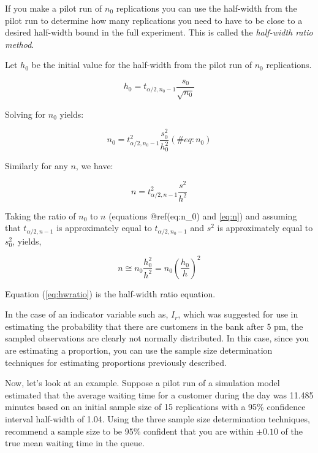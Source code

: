 \documentclass[
]{book}
\theoremstyle{definition}
\theoremstyle{definition}
\theoremstyle{definition}
\theoremstyle{definition}
\theoremstyle{remark}
\begin{document}
If you make a pilot run of \(n_0\) replications you can use the half-width from the pilot run
to determine how many replications you need to have to be close to a
desired half-width bound in the full experiment. This is called the
\emph{half-width ratio method}.

Let \(h_0\) be the initial value for the half-width from the pilot run of
\(n_0\) replications.

\begin{equation}
h_0 = t_{\alpha/2, n_0 - 1} \dfrac{s_0}{\sqrt{n_0}}
\label{eq:hNot}
\end{equation}

Solving for \(n_0\) yields:

\begin{equation}
n_0 = t_{\alpha/2, n_0 -1}^{2} \dfrac{s_{0}^{2}}{h_{0}^{2}}
(\#eq:n_0)
\end{equation}

Similarly for any \(n\), we have:

\begin{equation}
n = t_{\alpha/2, n-1}^{2} \dfrac{s^{2}}{h^{2}}
\label{eq:n}
\end{equation}

Taking the ratio of \(n_0\) to \(n\) (equations @ref(eq:n\_0) and \eqref{eq:n}) and assuming
that \(t_{\alpha/2, n-1}\) is approximately equal to
\(t_{\alpha/2, n_0 - 1}\) and \(s^2\) is approximately equal to \(s_0^2\),
yields,

\begin{equation}
n \cong n_0 \dfrac{h_0^2}{h^2} = n_0 \left(\frac{h_0}{h}\right)^2
\label{eq:hwratio}
\end{equation}

Equation (\eqref{eq:hwratio}) is the half-width ratio equation.

In the case of an indicator variable such as, \(I_r\), which was suggested
for use in estimating the probability that there are customers in the
bank after 5 pm, the sampled observations are clearly not normally
distributed. In this case, since you are estimating a proportion, you
can use the sample size determination techniques for estimating
proportions previously described.

Now, let's look at an example. Suppose a pilot run of a
simulation model estimated that the average waiting time for a customer
during the day was 11.485 minutes based on an initial sample size of 15
replications with a 95\% confidence interval half-width of 1.04. Using
the three sample size determination techniques, recommend a sample size
to be 95\% confident that you are within \(\pm 0.10\) of the true mean
waiting time in the queue.
\end{document}
